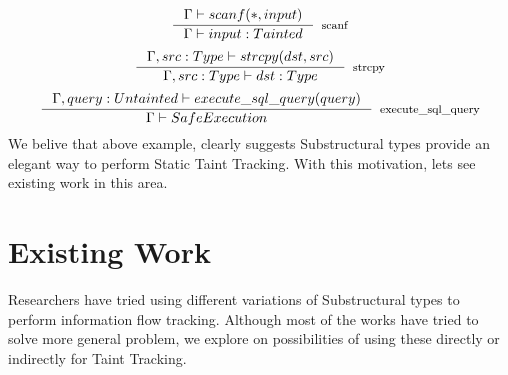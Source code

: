 \documentclass[11pt, pdftex]{article}
\begin{document}
$$ \inference {\Gamma \vdash scanf(*,input) }{\Gamma \vdash input:Tainted }[scanf]$$
$$ \inference {\Gamma, src:Type \vdash strcpy(dst,src) }{\Gamma, src:Type \vdash dst:Type}[strcpy]$$
$$ \inference {\Gamma, query:Untainted \vdash execute\_sql\_query(query)}{\Gamma \vdash Safe Execution}[execute\_sql\_query]$$
We belive that above example, clearly suggests Substructural types provide an elegant way to perform Static Taint Tracking. With this motivation, lets see existing work in this area.
\section{Existing Work}
Researchers have tried using different variations of Substructural types to perform information flow tracking. Although most of the works have tried to solve more general problem, we explore on possibilities of using these  directly or indirectly for Taint Tracking.
\end{document}
